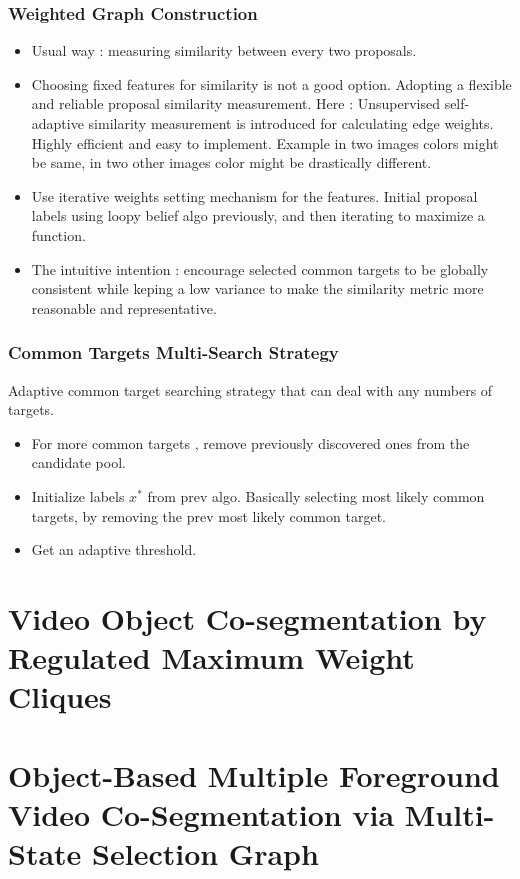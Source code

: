 \documentclass{article}
\begin{document}
\subsubsection{Weighted Graph Construction}
\begin{itemize}
\item Usual way : measuring similarity between every two proposals.
\item Choosing fixed features for similarity is not a good option. Adopting a flexible and reliable proposal similarity measurement. Here : Unsupervised self-adaptive similarity measurement is introduced for calculating edge weights. Highly efficient and easy to implement. Example in two images colors might be same, in two other images color might be drastically different.
\item Use iterative weights setting mechanism for the features. Initial proposal labels using loopy belief algo previously, and then iterating to maximize a function.
\item The intuitive intention : encourage selected common targets to be globally consistent while keping a low variance to make the similarity metric more reasonable and representative.
\end{itemize}

\subsubsection{Common Targets Multi-Search Strategy}
Adaptive common target searching strategy that can deal with any numbers of targets.

\begin{itemize}
\item For more common targets , remove previously discovered ones from the candidate pool.
\item Initialize labels $x^{*}$ from prev algo. Basically selecting most likely common targets, by removing the prev most likely common target.
\item Get an adaptive threshold.
\end{itemize}


\section{Video Object Co-segmentation by Regulated Maximum Weight Cliques}
\cite{Zhang2014}
\section{Object-Based Multiple Foreground Video Co-Segmentation via Multi-State Selection Graph}
\cite{7120111}




\end{document}
